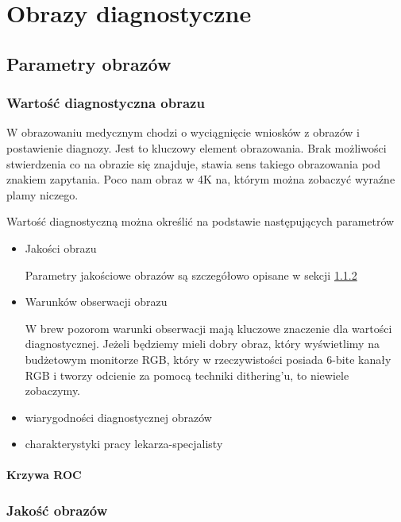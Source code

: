 \section{Obrazy diagnostyczne}

\subsection{Parametry obrazów}

\subsubsection{Wartość diagnostyczna obrazu}

W obrazowaniu medycznym chodzi o wyciągnięcie wniosków z obrazów i postawienie diagnozy.
Jest to kluczowy element obrazowania.
Brak możliwości stwierdzenia co na obrazie się znajduje, stawia sens takiego obrazowania pod znakiem zapytania.
Poco nam obraz w 4K na, którym można zobaczyć wyraźne plamy niczego.

Wartość diagnostyczną można określić na podstawie następujących parametrów
\begin{itemize}
    \item Jakości obrazu
    
    Parametry jakościowe obrazów są szczegółowo opisane w sekcji \ref{sec:image-quality}

    \item Warunków obserwacji obrazu

    W brew pozorom warunki obserwacji mają kluczowe znaczenie dla wartości diagnostycznej.
    Jeżeli będziemy mieli dobry obraz, który wyświetlimy na budżetowym monitorze RGB, który w rzeczywistości posiada 6-bite kanały RGB i tworzy odcienie za pomocą techniki dithering'u, to niewiele zobaczymy.

    \item wiarygodności diagnostycznej obrazów

    \item charakterystyki pracy lekarza-specjalisty

\end{itemize}

\paragraph{Krzywa ROC}

\subsubsection{Jakość obrazów}
\label{sec:image-quality}

